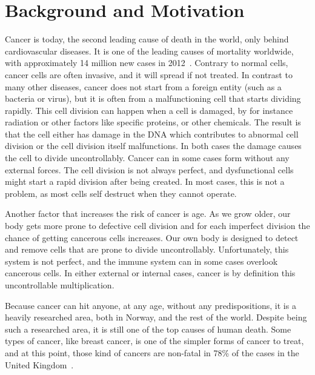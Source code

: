 \section{Background and Motivation}

Cancer is today, the second leading cause of death in the world, only behind cardiovascular diseases.  %
It is one of the leading causes of mortality worldwide, with approximately 14 million new cases in 2012~\cite{WHOCANCER}.
Contrary to normal cells, cancer cells are often invasive, and it will spread if not treated. 
In contrast to many other diseases, cancer does not start from a foreign entity (such as a bacteria or virus), but it is often from a malfunctioning cell that starts dividing rapidly. 
This cell division can happen when a cell is damaged, by for instance radiation or other factors like specific proteins, or other chemicals. The result is that the cell either has damage in the DNA which contributes to abnormal cell division or the cell division itself malfunctions. In both cases the damage causes the cell to divide uncontrollably. 
Cancer can in some cases form without any external forces. The cell division is not always perfect, and dysfunctional cells might start a rapid division after being created. In most cases, this is not a problem, as most cells self destruct when they cannot operate. 

Another factor that increases the risk of cancer is age. As we grow older, our body gets more prone to defective cell division and for each imperfect division the chance of getting cancerous cells increases.  
Our own body is designed to detect and remove cells that are prone to divide uncontrollably. Unfortunately, this system is not perfect, and the immune system can in some cases overlook cancerous cells.
In either external or internal cases, cancer is by definition this uncontrollable multiplication.




Because cancer can hit anyone, at any age, without any predispositions, it is a heavily researched area, both in Norway, and the rest of the world. Despite being such a researched area, it is still one of the top causes of human death. 
Some types of cancer, like breast cancer, is one of the simpler forms of cancer to treat, and at this point, those kind of cancers are non-fatal in 78\% of the cases in the United Kingdom~\cite{UKCancer}. 
    
